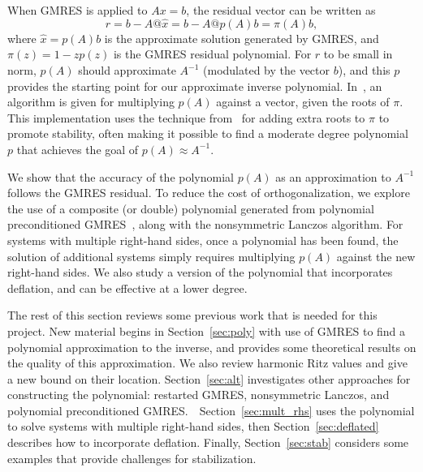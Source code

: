 \documentclass{siamart}
\def\wh#1{\widehat{#1}}
\begin{document}
When GMRES is applied to $Ax=b$, the residual vector can be written as 
\[r = b - A@\wh{x} = b - A@p(A)b = \pi(A)b,\] 
where $\wh{x} = p(A)b$ is the approximate solution generated by GMRES, and $\pi(z) = 1 - z p(z)$ is the GMRES residual polynomial.  For $r$ to be small in norm, $p(A)$ should approximate $A^{-1}$ (modulated by the vector $b$), and this $p$ provides the starting point for our approximate inverse polynomial.  In~\cite{PPGStable}, an algorithm is given for multiplying $p(A)$ against a vector, given the roots of $\pi$.  This implementation uses the technique from~\cite{PPArn} for adding extra roots to $\pi$ to promote stability, often making it possible to find a moderate degree polynomial $p$ that achieves the goal of $p(A) \approx A^{-1}$.  

We show that the accuracy of the polynomial $p(A)$ as an approximation to $A^{-1}$ follows the GMRES residual.  To reduce the cost of orthogonalization, we explore the use of a composite (or double) polynomial generated from polynomial preconditioned GMRES~\cite{PPGStable}, along with the nonsymmetric Lanczos algorithm. 
For systems with multiple right-hand sides, once a polynomial has been found, the solution of additional systems simply requires multiplying $p(A)$ against the new right-hand sides.  We also study a version of the polynomial that incorporates deflation, and can be effective at a lower degree.

The rest of this section reviews some previous work that is needed for this project.  New material begins in Section~\ref{sec:poly} with use of GMRES to find a polynomial approximation to the inverse, and provides some theoretical results on the quality of this approximation.  We also review harmonic Ritz values and give a new bound on their location.  Section~\ref{sec:alt} investigates other approaches for constructing the polynomial: restarted GMRES, nonsymmetric Lanczos, and polynomial preconditioned GMRES.\ \  Section~\ref{sec:mult_rhs} uses the polynomial to solve systems with multiple right-hand sides, then  Section~\ref{sec:deflated} describes how to incorporate deflation.  Finally, Section~\ref{sec:stab} considers some examples that provide challenges for stabilization.

\end{document}
